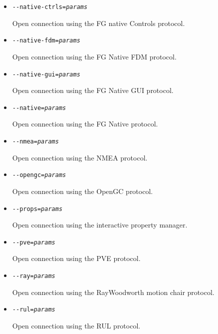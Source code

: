 {\begin{itemize}
  \item{\texttt{-$ $-native-ctrls={\it params}}}

    Open connection using the FG native Controls protocol.

  \item{\texttt{-$ $-native-fdm={\it params}}}

    Open connection using the FG Native FDM protocol.

  \item{\texttt{-$ $-native-gui={\it params}}}

    Open connection using the FG Native GUI protocol.

  \item{\texttt{-$ $-native={\it params}}}

    Open connection using the FG Native protocol.

  \item{\texttt{-$ $-nmea={\it params}}}

    Open connection using the NMEA protocol.

  \item{\texttt{-$ $-opengc={\it params}}}

    Open connection using the OpenGC protocol.

  \item{\texttt{-$ $-props={\it params}}}

    Open connection using the interactive property manager.

  \item{\texttt{-$ $-pve={\it params}}}

    Open connection using the PVE protocol.

  \item{\texttt{-$ $-ray={\it params}}}

    Open connection using the RayWoodworth motion chair protocol.

  \item{\texttt{-$ $-rul={\it params}}}

    Open connection using the RUL protocol.

  \end{itemize}
}

